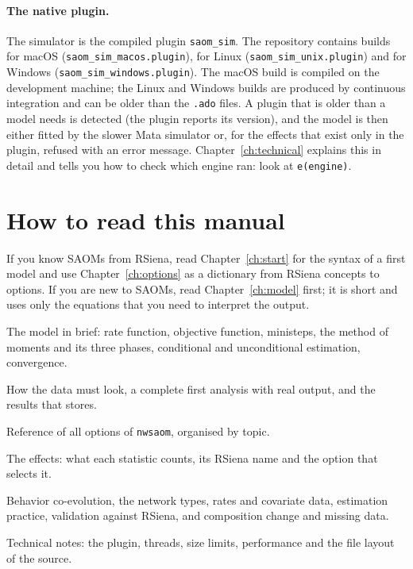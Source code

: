 \paragraph{The native plugin.} The simulator is the compiled plugin \texttt{saom\_sim}. The repository contains builds for macOS (\texttt{saom\_sim\_macos.plugin}), for Linux (\texttt{saom\_sim\_unix.plugin}) and for Windows (\texttt{saom\_sim\_windows.plugin}). The macOS build is compiled on the development machine; the Linux and Windows builds are produced by continuous integration and can be older than the \texttt{.ado} files. A plugin that is older than a model needs is detected (the plugin reports its version), and the model is then either fitted by the slower Mata simulator or, for the effects that exist only in the plugin, refused with an error message. Chapter~\ref{ch:technical} explains this in detail and tells you how to check which engine ran: look at \texttt{e(engine)}.

\section{How to read this manual}

If you know SAOMs from RSiena, read Chapter~\ref{ch:start} for the syntax of a first model and use Chapter~\ref{ch:options} as a dictionary from RSiena concepts to \nwsaom{} options. If you are new to SAOMs, read Chapter~\ref{ch:model} first; it is short and uses only the equations that you need to interpret the output.

\begin{description}[style=nextline,nosep]
  \item[Chapter~\ref{ch:model}] The model in brief: rate function, objective function, ministeps, the method of moments and its three phases, conditional and unconditional estimation, convergence.
  \item[Chapter~\ref{ch:start}] How the data must look, a complete first analysis with real output, and the results that \nwsaom{} stores.
  \item[Chapter~\ref{ch:options}] Reference of all options of \texttt{nwsaom}, organised by topic.
  \item[Chapter~\ref{ch:effects}] The effects: what each statistic counts, its RSiena name and the option that selects it.
  \item[Later chapters] Behavior co-evolution, the network types, rates and covariate data, estimation practice, validation against RSiena, and composition change and missing data.
  \item[Chapter~\ref{ch:technical}] Technical notes: the plugin, threads, size limits, performance and the file layout of the source.
\end{description}

